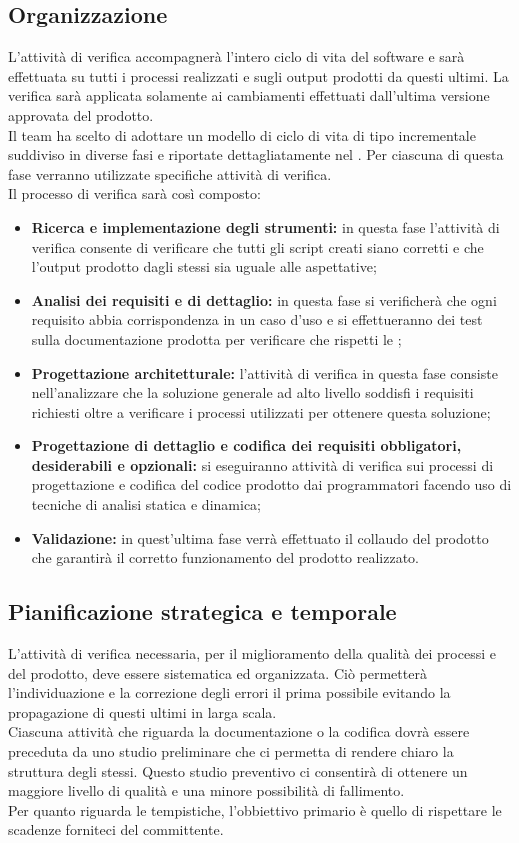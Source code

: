 	\subsection{Organizzazione}
	L'attività di verifica accompagnerà l'intero ciclo di vita del software e sarà effettuata su tutti i processi realizzati e sugli output prodotti da questi ultimi. La verifica sarà applicata solamente ai cambiamenti effettuati dall'ultima versione approvata del prodotto.\\
	Il team ha scelto di adottare un modello di ciclo di vita di tipo incrementale suddiviso in diverse fasi e riportate dettagliatamente nel \docNameVersionPdP. Per ciascuna di questa fase verranno utilizzate specifiche attività di verifica.\\ Il processo di verifica sarà così composto:
	\begin{itemize}
		\item \textbf{Ricerca e implementazione degli strumenti:}  in questa fase l'attività di verifica consente di verificare che tutti gli script creati siano corretti e che l'output prodotto dagli stessi sia uguale alle aspettative;
		\item \textbf{Analisi dei requisiti e di dettaglio:} in questa fase si verificherà che ogni requisito abbia corrispondenza in un caso d'uso e si effettueranno dei test sulla documentazione prodotta per verificare che rispetti le \docNameVersionNdP;
		\item \textbf{Progettazione architetturale:} l'attività di verifica in questa fase consiste nell'analizzare che la soluzione generale ad alto livello soddisfi i requisiti richiesti oltre a verificare i processi utilizzati per ottenere questa soluzione;
		\item \textbf{Progettazione di dettaglio e codifica dei requisiti obbligatori, desiderabili e opzionali:} si eseguiranno attività di verifica sui processi di progettazione e codifica del codice prodotto dai programmatori facendo uso di tecniche di analisi statica e dinamica;
		\item \textbf{Validazione:} in quest'ultima fase verrà effettuato il collaudo del prodotto che garantirà il corretto funzionamento del prodotto realizzato.
	\end{itemize}
	
	\subsection{Pianificazione strategica e temporale}
	L'attività di verifica necessaria, per il miglioramento della qualità dei processi e del prodotto, deve essere sistematica ed organizzata. Ciò permetterà l'individuazione e la correzione degli errori il prima possibile evitando la propagazione di questi ultimi in larga scala.\\
	Ciascuna attività che riguarda la documentazione o la codifica dovrà essere preceduta da uno studio preliminare che ci permetta di rendere chiaro la struttura degli stessi. Questo studio preventivo ci consentirà di ottenere un maggiore livello di qualità e una minore possibilità di fallimento. \\
	Per quanto riguarda le tempistiche, l'obbiettivo primario è quello di rispettare le scadenze forniteci del committente.
